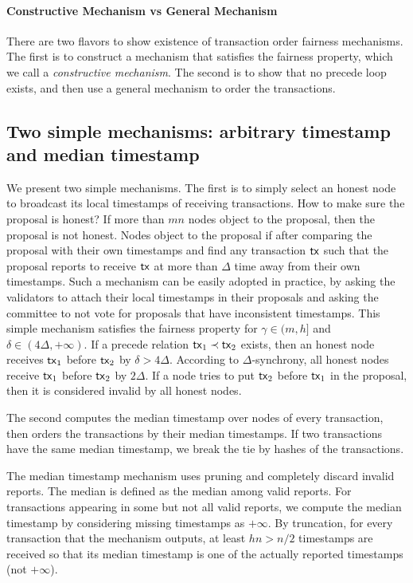 \documentclass[runningheads]{llncs}
\begin{document}
\paragraph{Constructive Mechanism vs General Mechanism} There are two flavors to show existence of transaction order fairness mechanisms. The first is to construct a mechanism that satisfies the fairness property, which we call a \emph{constructive mechanism}. The second is to show that no precede loop exists, and then use a general mechanism to order the transactions. 

\subsection{Two simple mechanisms: arbitrary timestamp and median timestamp}
We present two simple mechanisms. The first is to simply select an honest node to broadcast its local timestamps of receiving transactions. How to make sure the proposal is honest? If more than $mn$ nodes object to the proposal, then the proposal is not honest. Nodes object to the proposal if after comparing the proposal with their own timestamps and find any transaction $\mathsf{tx}$ such that the proposal reports to receive $\mathsf{tx}$ at more than $\Delta$ time away from their own timestamps. Such a mechanism can be easily adopted in practice, by asking the validators to attach their local timestamps in their proposals and asking the committee to not vote for proposals that have inconsistent timestamps. This simple mechanism satisfies the fairness property for $\gamma\in(m,h]$ and $\delta\in(4\Delta,+\infty)$. If a precede relation $\mathsf{tx}_1\prec \mathsf{tx}_2$ exists, then an honest node receives $\mathsf{tx}_1$ before $\mathsf{tx}_2$ by $\delta>4\Delta$. According to $\Delta$-synchrony, all honest nodes receive $\mathsf{tx}_1$ before $\mathsf{tx}_2$ by $2\Delta$. If a node tries to put $\mathsf{tx}_2$ before $\mathsf{tx}_1$ in the proposal, then it is considered invalid by all honest nodes. 

The second computes the median timestamp over nodes of every transaction, then orders the transactions by their median timestamps. If two transactions have the same median timestamp, we break the tie by hashes of the transactions. 

The median timestamp mechanism uses pruning and completely discard invalid reports. The median is defined as the median among valid reports. For transactions appearing in some but not all valid reports, we compute the median timestamp by considering missing timestamps as $+\infty$. By truncation, for every transaction that the mechanism outputs, at least $hn>n/2$ timestamps are received so that its median timestamp is one of the actually reported timestamps (not $+\infty$).  
\end{document}
